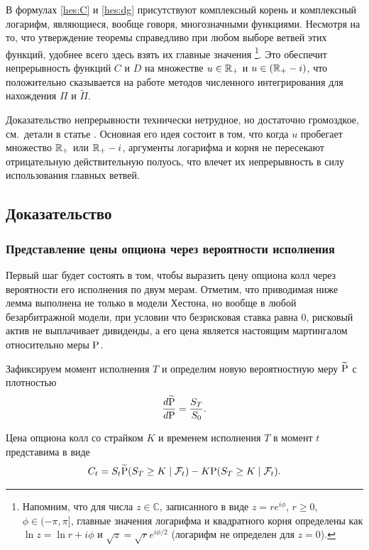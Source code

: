 \begin{remark}
В формулах \eqref{hes:C} и \eqref{hes:dg} присутствуют комплексный корень и комплексный логарифм, являющиеся, вообще говоря, многозначными функциями.
Несмотря на то, что утверждение теоремы справедливо при любом выборе ветвей этих функций, удобнее всего здесь взять их главные значения%
\footnote{Напомним, что для числа $z\in\mathbb{C}$, записанного в виде $z=re^{i\phi}$, $r\ge 0$, $\phi\in(-\pi,\pi]$, главные значения логарифма и квадратного корня определены как $\ln z = \ln r + i\phi$ и $\sqrt{z} = \sqrt{r}e^{i\phi/2}$ (логарифм не определен для $z=0$).}. Это обеспечит непрерывность функций $C$ и $D$ на множестве $u\in\R_+$ и $u\in (\R_+-i)$, что положительно сказывается на работе методов численного интегрирования для нахождения $\Pi$ и $\tilde\Pi$.

Доказательство непрерывности технически нетрудное, но достаточно громоздкое, см.~детали в статье \cite{Albrecher+05}.
Основная его идея состоит в том, что когда $u$ пробегает множество $\R_+$ или $\R_+-i$, аргументы логарифма и корня не пересекают отрицательную действительную полуось, что влечет их непрерывность в силу использования главных ветвей.
\end{remark}


\subsection{Доказательство}
\subsubsection{Представление цены опциона через вероятности исполнения}

Первый шаг будет состоять в том, чтобы выразить цену опциона колл через вероятности его исполнения по двум мерам.
Отметим, что приводимая ниже лемма выполнена не только в модели Хестона, но вообще в любой безарбитражной модели, при условии что безрисковая ставка равна 0, рисковый актив не выплачивает дивиденды, а его цена является настоящим мартингалом относительно меры $\P$.

Зафиксируем момент исполнения $T$ и определим новую вероятностную меру $\tilde\P$ с плотностью
\[
\frac{d\tilde\P}{d\P} = \frac{S_T}{S_0}. 
\]

\begin{lemma}
\label{hes:l:price-through-prob}
Цена опциона колл со страйком $K$ и временем исполнения $T$ в момент $t$ представима в виде 
\[
C_t = S_t \tilde\P(S_T\ge K\mid \F_t) - K\P(S_T\ge K\mid \F_t).
\]
\end{lemma}

